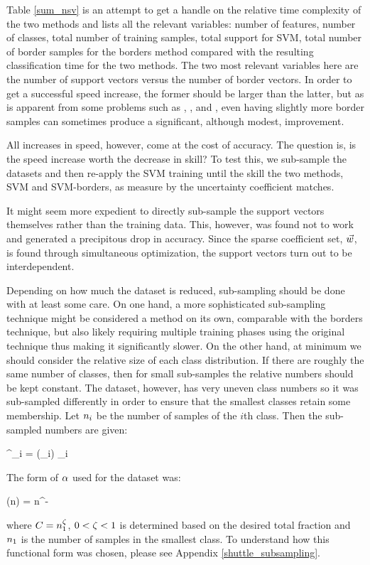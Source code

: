 Table \ref{sum_nsv} is an attempt to get a handle on the relative time complexity 
of the two methods and lists all the relevant variables: number of features,
number of classes, total number of training samples, total support for SVM,
total number of border samples for the borders method compared with the resulting
classification time for the two methods. The two most relevant variables here are the
number of support vectors versus the number of border vectors.
In order to get a successful speed increase, the former should be larger than 
the latter, but as is apparent from some problems such as , , and ,
even having slightly more border samples can sometimes produce a significant,
although modest, improvement.

All increases in speed, however, come at the cost of accuracy.
The question is, is the speed increase worth the decrease in skill?
To test this, we sub-sample the datasets and then re-apply the SVM training
until the skill the two methods, SVM and SVM-borders, as measure by
the uncertainty coefficient matches.

It might seem more expedient to directly sub-sample the support vectors themselves
rather than the training data.
This, however, was found not to work and generated a precipitous drop in accuracy. 
Since the sparse coefficient set, $\vec {w}$, is found through simultaneous 
optimization, the support vectors turn out to be interdependent.

Depending on how much the dataset is reduced, sub-sampling should be done with at
least some care. 
On one hand, a more sophisticated sub-sampling technique might be considered a method on its own, 
comparable with the borders technique, but also likely requiring multiple training phases using the
original technique thus making it significantly slower.
On the other hand, at minimum we should consider the relative size of each class distribution.
If there are roughly the same number of classes, then for small sub-samples the relative
numbers should be kept constant.
The  dataset, however, has very uneven class numbers so it was sub-sampled differently
in order to ensure that the smallest classes retain some membership.
Let $n_i$ be the number of samples of the $i$th class.
Then the sub-sampled numbers are given:
\begin{eqnnon}
	\classsize^\prime_i = \subsample(\classsize_i) \classsize_i
	\label{subsample}
\end{eqnnon}
The form of $\alpha$ used for the  dataset was:
\begin{eqnnon}
	\subsample(n) = \submultcoef n^{-\subexp}
	\label{subfunction}
\end{eqnnon}
where $C=n_1^\zeta$, $0 < \zeta < 1$ is determined based on the
desired total fraction and $n_1$ is the number of samples in the 
smallest class.
To understand how this functional form was chosen, please see Appendix \ref{shuttle_subsampling}.

